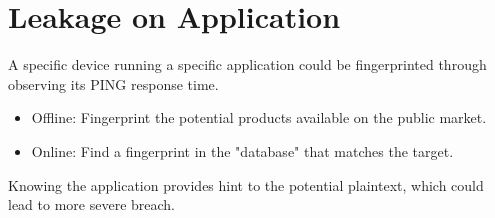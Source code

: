 \section{Leakage on Application}

A specific device running a specific application could be fingerprinted through observing its PING response time.

\begin{itemize}
	\item Offline: Fingerprint the potential products available on the public market.
	\item Online: Find a fingerprint in the "database" that matches the target.
\end{itemize}

Knowing the application provides hint to the potential plaintext, which could lead to more severe breach.
